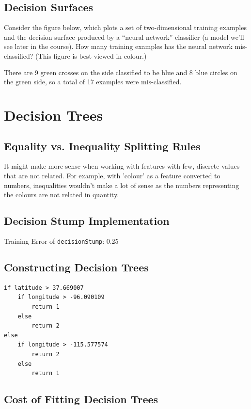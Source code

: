 \documentclass{article}
\def\blu#1{{\color{blu}#1}}
\begin{document}
\subsection{Decision Surfaces}

Consider the figure below, which plots a set of two-dimensional training examples and the decision surface produced by a ``neural network'' classifier (a model we'll see later in the course).
\blu{How many training examples has the neural network mis-classified?} (This figure is best viewed in colour.)

There are 9 green crosses on the side classified to be blue and 8 blue circles on the green side, so a total of 17 examples were mis-classified.

\section{Decision Trees}


\subsection{Equality vs. Inequality Splitting Rules}

It might make more sense when working with features with few, discrete values that are not related. For example, with 'colour' as a feature converted to numbers, inequalities wouldn't make a lot of sense as the numbers representing the colours are not related in quantity.

\subsection{Decision Stump Implementation}

Training Error of \texttt{decisionStump}: 0.25

\subsection{Constructing Decision Trees}
\begin{verbatim}
if latitude > 37.669007
    if longitude > -96.090109
        return 1
    else
        return 2
else
    if longitude > -115.577574
        return 2
    else
        return 1
\end{verbatim}



\subsection{Cost of Fitting Decision Trees}
\end{document}
